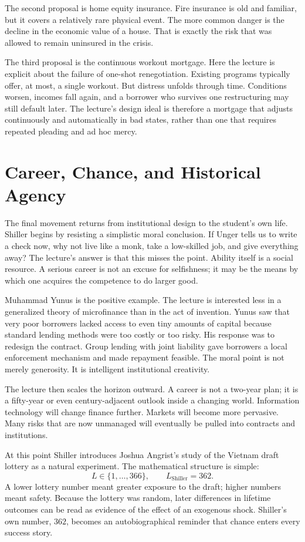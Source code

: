 The second proposal is home equity insurance. Fire insurance is old and familiar, but it covers a relatively rare physical event. The more common danger is the decline in the economic value of a house. That is exactly the risk that was allowed to remain uninsured in the crisis.

The third proposal is the continuous workout mortgage. Here the lecture is explicit about the failure of one-shot renegotiation. Existing programs typically offer, at most, a single workout. But distress unfolds through time. Conditions worsen, incomes fall again, and a borrower who survives one restructuring may still default later. The lecture's design ideal is therefore a mortgage that adjusts continuously and automatically in bad states, rather than one that requires repeated pleading and ad hoc mercy.

\section{Career, Chance, and Historical Agency}

The final movement returns from institutional design to the student's own life. Shiller begins by resisting a simplistic moral conclusion. If Unger tells us to write a check now, why not live like a monk, take a low-skilled job, and give everything away? The lecture's answer is that this misses the point. Ability itself is a social resource. A serious career is not an excuse for selfishness; it may be the means by which one acquires the competence to do larger good.

Muhammad Yunus is the positive example. The lecture is interested less in a generalized theory of microfinance than in the act of invention. Yunus saw that very poor borrowers lacked access to even tiny amounts of capital because standard lending methods were too costly or too risky. His response was to redesign the contract. Group lending with joint liability gave borrowers a local enforcement mechanism and made repayment feasible. The moral point is not merely generosity. It is intelligent institutional creativity.

The lecture then scales the horizon outward. A career is not a two-year plan; it is a fifty-year or even century-adjacent outlook inside a changing world. Information technology will change finance further. Markets will become more pervasive. Many risks that are now unmanaged will eventually be pulled into contracts and institutions.

At this point Shiller introduces Joshua Angrist's study of the Vietnam draft lottery as a natural experiment. The mathematical structure is simple:
\begin{equation}
L \in \{1,\dots,366\},\qquad L_{\text{Shiller}}=362.
\end{equation}
A lower lottery number meant greater exposure to the draft; higher numbers meant safety. Because the lottery was random, later differences in lifetime outcomes can be read as evidence of the effect of an exogenous shock. Shiller's own number, \(362\), becomes an autobiographical reminder that chance enters every success story.

